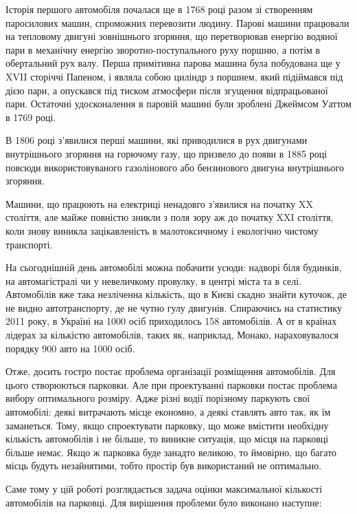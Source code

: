 

Історія першого автомобіля почалася ще в 1768 році разом зі створенням паросилових машин, спроможних перевозити людину. Парові машини працювали на тепловому двигуні зовнішнього згоряння, що перетворював енергію водяної пари в механічну енергію зворотно-поступального руху поршню, а потім в обертальний рух валу. Перша примітивна парова машина була побудована ще у XVII сторіччі Папеном, і являла собою циліндр з поршнем, який підіймався під дією пари, а опускався під тиском атмосфери після згущення відпрацьованої пари. Остаточні удосконалення в паровій машині були зроблені Джеймсом Уаттом в 1769 році.

В 1806 році з’явилися перші машини, які приводилися в рух двигунами внутрішнього згоряння на горючому газу, що призвело до появи в 1885 році повсюди використовуваного газолінового або бензинового двигуна внутрішнього згоряння.

Машини, що працюють на електриці ненадовго з’явилися на початку XX століття, але майже повністю зникли з поля зору аж до початку XXI століття, коли знову виникла зацікавленість в малотоксичному і екологічно чистому транспорті.

На сьогоднішній день автомобілі можна побачити усюди: надворі біля будинків, на автомагістралі чи у невеличкому провулку, в центрі міста та в селі. Автомобілів вже така незліченна кількість, що в Києві скадно знайти куточок, де не видно автотранспорту, де не чутно гулу двигунів.
Спираючись на статистику 2011 року, в Україні на 1000 осіб приходилось 158 автомобілів. А от в країнах лідерах за кількістю автомобілів, таких як, наприклад, Монако, нараховувалося порядку 900 авто на 1000 осіб.

Отже, досить гостро постає проблема організації розміщення автомобілів. Для цього створюються парковки. Але при проектуванні парковки постає проблема вибору оптимального розміру. Адже різні водії порізному паркують свої автомобілі: деякі витрачають місце економно, а деякі ставлять авто так, як їм заманеться. Тому, якщо спроектувати парковку, що може вмістити необхідну кількість автомобілів і не більше, то виникне ситуація, що місця на парковці більше немає. Якщо ж парковка буде занадто великою, то ймовірно, що багато місць будуть незайнятими, тобто простір був використаний не оптимально.

Саме тому у цій роботі розглядається задача оцінки максимальної кількості автомобілів на парковці. Для вирішення проблеми було виконано наступне:

